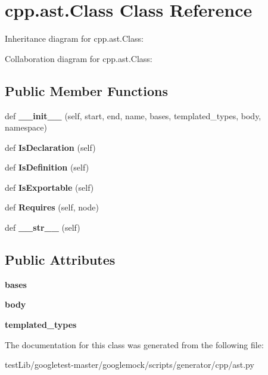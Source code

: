 \hypertarget{classcpp_1_1ast_1_1Class}{}\section{cpp.\+ast.\+Class Class Reference}
\label{classcpp_1_1ast_1_1Class}


Inheritance diagram for cpp.\+ast.\+Class\+:


Collaboration diagram for cpp.\+ast.\+Class\+:
\subsection*{Public Member Functions}
\begin{DoxyCompactItemize}
\item 
\mbox{\label{classcpp_1_1ast_1_1Class_acc17c34512d5cc54d5125734ce79f219}} 
def {\bfseries \+\_\+\+\_\+init\+\_\+\+\_\+} (self, start, end, name, bases, templated\+\_\+types, body, namespace)
\item 
\mbox{\label{classcpp_1_1ast_1_1Class_a4758bfb7c00410575932974e1ed8b7da}} 
def {\bfseries Is\+Declaration} (self)
\item 
\mbox{\label{classcpp_1_1ast_1_1Class_ae6d2356f835d06d5109d9e4609d86780}} 
def {\bfseries Is\+Definition} (self)
\item 
\mbox{\label{classcpp_1_1ast_1_1Class_a1ab749f8cfddb0903c6484791f70f42e}} 
def {\bfseries Is\+Exportable} (self)
\item 
\mbox{\label{classcpp_1_1ast_1_1Class_a347673e0a2a7b840b7d2d1cae13977f7}} 
def {\bfseries Requires} (self, node)
\item 
\mbox{\label{classcpp_1_1ast_1_1Class_a0a63f6fab75d61ffac6fb9f1c29ae84d}} 
def {\bfseries \+\_\+\+\_\+str\+\_\+\+\_\+} (self)
\end{DoxyCompactItemize}
\subsection*{Public Attributes}
\begin{DoxyCompactItemize}
\item 
\mbox{\label{classcpp_1_1ast_1_1Class_a5665eb67314a075d4e0ff91accbde5d1}} 
{\bfseries bases}
\item 
\mbox{\label{classcpp_1_1ast_1_1Class_add39f61fdcf6dae42d79cac3dcbb7782}} 
{\bfseries body}
\item 
\mbox{\label{classcpp_1_1ast_1_1Class_a48ed0d3115656554d9134bc1787390fa}} 
{\bfseries templated\+\_\+types}
\end{DoxyCompactItemize}


The documentation for this class was generated from the following file\+:\begin{DoxyCompactItemize}
\item 
test\+Lib/googletest-\/master/googlemock/scripts/generator/cpp/ast.\+py\end{DoxyCompactItemize}
